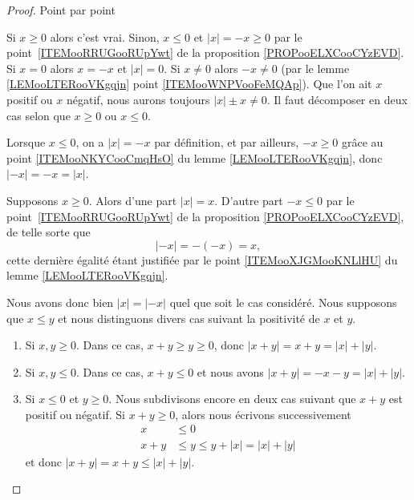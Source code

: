 \begin{proof}
	Point par point
	\begin{subproof}
		Si \( x\geq 0\) alors c'est vrai. Sinon, \( x\leq 0\) et \( | x |=-x\geq 0\) par le point~\ref{ITEMooRRUGooRUpYwt} de la proposition \ref{PROPooELXCooCYzEVD}.
		\spitem[\ref{ITEMooLQLTooTJTPVM}]
		Si \( x=0\) alors \( x=-x\) et \( | x |=0\).  Si \(x\neq 0\) alors \( -x\neq 0\) (par le lemme \ref{LEMooLTERooVKgqjn} point \ref{ITEMooWNPVooFeMQAp}).  Que l'on ait \( x\) positif ou \( x\) négatif, nous aurons toujours \( | x | \pm x\neq 0\).
		Il faut décomposer en deux cas selon que \( x\geq 0\) ou  \( x\leq 0\).

		Lorsque \( x\leq 0\), on a \( | x |= - x\) par définition, et par ailleurs, \( -x\geq 0\) grâce au point \ref{ITEMooNKYCooCmqHsO} du lemme \ref{LEMooLTERooVKgqjn}, donc \( | -x |= - x = | x |\).

		Supposons \( x\geq 0\). Alors d'une part \( | x |=x\). D'autre part \( -x\leq 0\) par le point~\ref{ITEMooRRUGooRUpYwt} de la proposition \ref{PROPooELXCooCYzEVD}, de telle sorte que
		\begin{equation}
			| -x |=-(-x)=x,
		\end{equation}
		cette dernière égalité étant justifiée par le point \ref{ITEMooXJGMooKNLlHU} du lemme \ref{LEMooLTERooVKgqjn}.

		Nous avons donc bien \( | x |=| -x |\) quel que soit le cas considéré.
		Nous supposons que \( x\leq y\) et nous distinguons divers cas suivant la positivité de \( x\) et \( y\).
		\begin{enumerate}
			\item
			      Si \( x,y\geq 0\). Dans ce cas, \( x+y\geq y\geq 0\), donc \( | x+y |=x+y=| x |+| y |\).
			\item
			      Si \( x,y\leq 0\). Dans ce cas, \( x+y\leq 0\) et nous avons \( | x+y |=-x-y=| x |+| y |\).
			\item
			      Si \( x\leq 0\) et \( y\geq 0\). Nous subdivisons encore en deux cas suivant que \( x+y\) est positif ou négatif. Si \( x+y\geq 0\), alors nous écrivons successivement
			      \begin{subequations}
				      \begin{align}
					      x   & \leq 0                         \\
					      x+y & \leq y\leq y+| x |=| x |+| y |
				      \end{align}
			      \end{subequations}
			      et donc \( | x+y |=x+y\leq | x |+| y |\).


\end{enumerate}
\end{subproof}
\end{proof}
